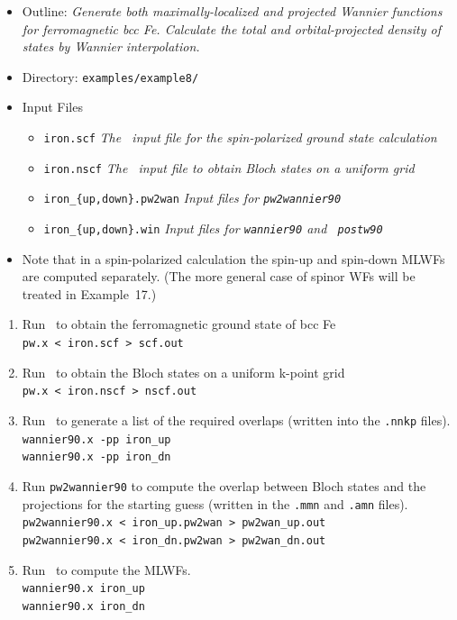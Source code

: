 \documentclass[a4paper,11pt,twoside]{article}
\begin{document}

\begin{itemize}
\item{Outline: \it{Generate both maximally-localized and projected
      Wannier functions for ferromagnetic bcc Fe. Calculate the total
      and orbital-projected density of states by Wannier
      interpolation.}}
\item{Directory: {\tt examples/example8/}}
\item{Input Files}
\begin{itemize}
\item{ {\tt iron.scf} {\it The \pwscf\ input file for the
      spin-polarized ground state calculation}}
\item{ {\tt iron.nscf}  {\it The \pwscf\ input file to obtain Bloch states
    on a uniform grid}} 
\item{ {\tt iron\_\{up,down\}.pw2wan}  {\it Input files for {\tt pw2wannier90}}} 
\item{ {\tt iron\_\{up,down\}.win} {\it Input files for {\tt wannier90} and {\tt
          postw90}}}
\end{itemize}
\item{Note that in a spin-polarized calculation the spin-up and
    spin-down MLWFs are computed separately. (The more general case of
    spinor WFs will be treated in Example~17.)}
\end{itemize}

\begin{enumerate}
\item Run \pwscf\ to obtain the ferromagnetic ground state of bcc Fe\\
{\tt pw.x < iron.scf > scf.out}

\item Run \pwscf\ to obtain the Bloch states on a uniform k-point grid\\
{\tt pw.x < iron.nscf > nscf.out}

\item Run \wannier\ to generate a list of the required overlaps (written
  into the {\tt .nnkp} files).\\
{\tt wannier90.x -pp iron\_up}\\
{\tt wannier90.x -pp iron\_dn}

\item Run {\tt pw2wannier90} to compute the overlap between Bloch
  states and the projections for the starting guess (written in the
  {\tt .mmn} and {\tt .amn} files).\\
  {\tt pw2wannier90.x < iron\_up.pw2wan > pw2wan\_up.out}\\
  {\tt pw2wannier90.x < iron\_dn.pw2wan > pw2wan\_dn.out}

\item Run \wannier\ to compute the MLWFs.\\
{\tt wannier90.x iron\_up}\\
{\tt wannier90.x iron\_dn}

\end{enumerate}
\end{document}
